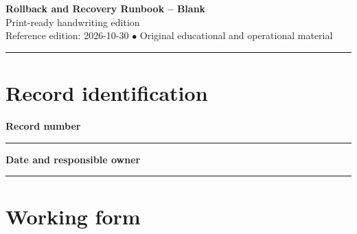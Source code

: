 \documentclass[10pt,letterpaper]{article}
\begin{document}
\begin{center}
{\LARGE\bfseries\color{cdblue}Rollback and Recovery Runbook -- Blank}\\[7pt]
{\large Print-ready handwriting edition}\\[6pt]
{\small Reference edition: 2026-10-30 $\bullet$ Original educational and operational material}
\end{center}
\noindent\color{cdblue}\rule{\linewidth}{1.2pt}\color{black}
\vspace{0.4em}
\section{Record identification}
\textbf{Record number}\par
\noindent\rule{\linewidth}{0.35pt}\par\vspace{0.7em}
\textbf{Date and responsible owner}\par
\noindent\rule{\linewidth}{0.35pt}\par\vspace{0.7em}

\section{Working form}
\end{document}
